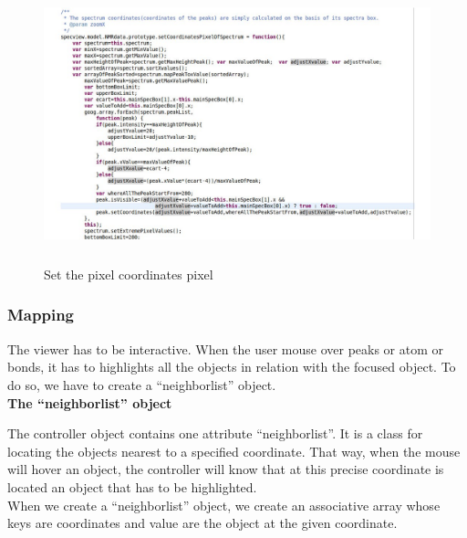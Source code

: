     \begin{figure}[h]
    \begin{centering}
    \caption{Set the pixel coordinates pixel}
\includegraphics[width=180mm,height=80mm]{./images/setSpecPixel}
    \end{centering}
    \end{figure}

\subsubsection{Mapping}
The viewer has to be interactive. When the user mouse over peaks or atom or bonds, it has to highlights all the objects in relation with the focused object. To do so, we have to create a ``neighborlist'' object.\\

\textbf{The ``neighborlist'' object}

The controller object contains one attribute ``neighborlist''. It is a class for locating the objects nearest to a specified coordinate. That way, when the mouse will hover an object, the controller will know that at this precise coordinate is located an object that has to be highlighted.\\
When we create a ``neighborlist'' object, we create an associative array whose keys are coordinates and value are the object at the given coordinate.
\clearpage
